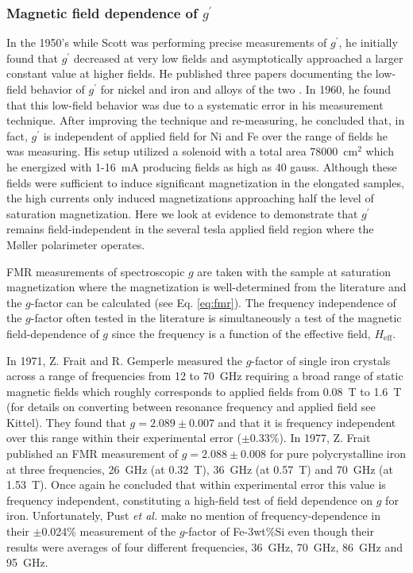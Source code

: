 \documentclass[preprint,12pt]{elsarticle}
\begin{document}
{\subsubsection{Magnetic field dependence of $g^{\prime}$}
In the 1950's while Scott was performing precise measurements of $g^{\prime}$, he initially found that $g^{\prime}$ decreased at very low fields and asymptotically approached a larger constant value at higher fields. He published three papers documenting the low-field behavior of $g^{\prime}$ for nickel and iron and alloys of the two \cite{ScottAug1955, ScottSep1955, ScottAug1956}. In 1960, he found that this low-field behavior was due to a systematic error in his measurement technique\cite{Scott1960}. After improving the technique and re-measuring, he concluded that, in fact, $g^\prime$ is independent of applied field for Ni and Fe over the range of fields he was measuring. His setup utilized a solenoid with a total area 78000~cm$^2$ which he energized with 1-16~mA producing fields as high as 40 gauss. Although these fields were sufficient to induce significant magnetization in the elongated samples, the high currents only induced magnetizations approaching half the level of saturation magnetization. Here we look at evidence to demonstrate that $g^\prime$ remains field-independent in the several tesla applied field region where the M\o ller polarimeter operates.

FMR measurements of spectroscopic $g$ are taken with the sample at saturation magnetization where the magnetization is well-determined from the literature and the $g$-factor can be calculated (see Eq. \ref{eq:fmr}). The frequency independence of the $g$-factor often tested in the literature is simultaneously a test of the magnetic field-dependence of $g$ since the frequency is a function of the effective field, $H_{\textrm{eff}}$.

In 1971, Z. Frait and R. Gemperle measured the $g$-factor of single iron crystals across a range of frequencies from 12 to 70~GHz requiring a broad range of static magnetic fields\cite{Frait1971} which roughly corresponds to applied fields from  0.08~T to 1.6~T (for details on converting between resonance frequency and applied field see Kittel\cite{Kittel1948}). They found that $g=2.089\pm0.007$ and that it  is frequency independent over this range within their experimental error ($\pm$0.33\%). In 1977, Z. Frait published an FMR measurement of $g=2.088\pm0.008$ for pure polycrystalline iron at three frequencies, 26~GHz (at 0.32~T), 36~GHz (at 0.57~T) and 70~GHz (at 1.53~T)\cite{Frait1977}. Once again he concluded that within experimental error this value is frequency independent, constituting a high-field test of field dependence on $g$ for iron. Unfortunately, Pust {\it et al.} make no mention of frequency-dependence in their $\pm$0.024\% measurement of the $g$-factor of Fe-3wt\%Si even though their results were averages of four different frequencies, 36~GHz, 70~GHz, 86~GHz and 95~GHz\cite{Pust1981}. 

}
\end{document}
